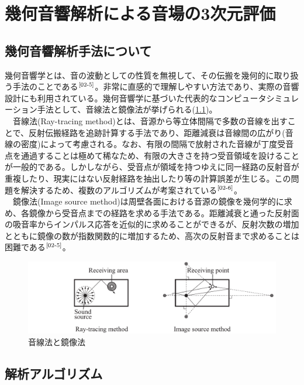 \chapter{幾何音響解析による音場の3次元評価}

\section{幾何音響解析手法について}
幾何音響学とは、音の波動としての性質を無視して、その伝搬を幾何的に取り扱う手法のことである$^{\text{\cite{02-5}}}$。非常に直感的で理解しやすい方法であり、実際の音響設計にも利用されている。幾何音響学に基づいた代表的なコンピュータシミュレーション手法として、音線法と鏡像法が挙げられる(\ref{fig:音線法と鏡像法})。
\\　音線法(Ray-tracing method)とは、音源から等立体間隔で多数の音線を出すことで、反射伝搬経路を追跡計算する手法であり、距離減衰は音線間の広がり(音線の密度)によって考慮される。なお、有限の間隔で放射された音線が丁度受音点を通過することは極めて稀なため、有限の大きさを持つ受音領域を設けることが一般的である。しかしながら、受音点が領域を持つゆえに同一経路の反射音が重複したり、現実にはない反射経路を抽出したり等の計算誤差が生じる。この問題を解決するため、複数のアルゴリズムが考案されている$^{\text{\cite{02-6}}}$。
\\　鏡像法(Image source method)は周壁各面における音源の鏡像を幾何学的に求め、各鏡像から受音点までの経路を求める手法である。距離減衰と通った反射面の吸音率からインパルス応答を近似的に求めることができるが、反射次数の増加とともに鏡像の数が指数関数的に増加するため、高次の反射音まで求めることは困難である$^{\text{\cite{02-5}}}$。

\begin{figure}[htbp]
    \centering
    \includegraphics[keepaspectratio,scale=0.8]{02_att/kikaonkyo.pdf}
    \caption{\hspace{1mm}音線法と鏡像法}
    \label{fig:音線法と鏡像法}
\end{figure}

\section{解析アルゴリズム}

